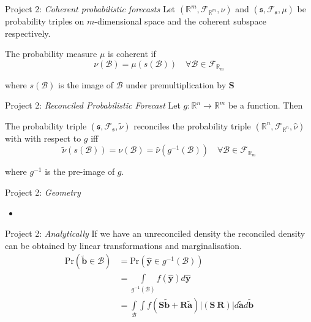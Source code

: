 \documentclass[11pt,xcolor=dvipsnames,handout]{beamer} %
\begin{document}
  \begin{frame}{Project 2: \textit{Coherent probabilistic forecasts}}
Let $(\mathbb{R}^m,\mathcal{F}_{\mathbb{R}^m},\nu)$ and $(\mathfrak{s},\mathcal{F}_{\mathfrak{s}},\mu)$ be probability triples on $m$-dimensional space and the coherent subspace respectively.
\begin{definition}
	The probability measure $\mu$ is coherent if
	\begin{equation*}
	\nu(\mathcal{B})=\mu(s(\mathcal{B}))\quad\forall\mathcal{B}\in \mathcal{F}_{\mathbb{R}_m}
	\end{equation*} 
\end{definition}
where $s(\mathcal{B})$ is the image of $\mathcal{B}$ under premultiplication by ${\bm S}$
\end{frame}

\begin{frame}{Project 2: \textit{Reconciled Probabilistic Forecast}}
Let $g:\mathbb{R}^n\rightarrow\mathbb{R}^m$ be a function.  Then 
\begin{definition}
	The probability triple $\left(\mathfrak{s},\mathcal{F}_{\mathfrak{s}},\tilde{\nu}\right)$ reconciles the probability triple $\left(\mathbb{R}^n,\mathcal{F}_{\mathbb{R}^n},\hat{\nu}\right)$ with with respect to $g$ iff
	\begin{equation*}
	\tilde{\nu}(s(\mathcal{B}))=\nu(\mathcal{B})=\hat{\nu}(g^{-1}(\mathcal{B}))\quad\forall \mathcal{B}\in\mathcal{F}_{\mathbb{R}_m}
	\end{equation*}
\end{definition}
where $g^{-1}$ is the pre-image of $g$.
\end{frame}


\begin{frame}{Project 2: \textit{Geometry}}
\begin{itemize}[<+-| alert@+>]
	\item[] \centering
	
\end{itemize}    
\end{frame}



  \begin{frame}{Project 2: \textit{Analytically}}
If we have an unreconciled density the reconciled density can be obtained by linear transformations and marginalisation.
\begin{align*}
\mbox{Pr}(\tilde{\bm{b}}\in \mathcal{B})&=\mbox{Pr}(\hat{\bm{y}}\in g^{-1}(\mathcal{B}))\\
&=\int\limits_{g^{-1}(\mathcal{B})}f(\hat{\bm{y}})d\hat{\bm{y}}\\
&=\int\limits_{\mathcal{B}}\int f(\bm{S}\tilde{\bm{b}}+\bm{R}\tilde{\bm{a}})|\left(\bm{S}~\bm{R}\right)|d\tilde{\bm{a}}d\tilde{\bm{b}}
\end{align*}
\end{frame}
\end{document}
